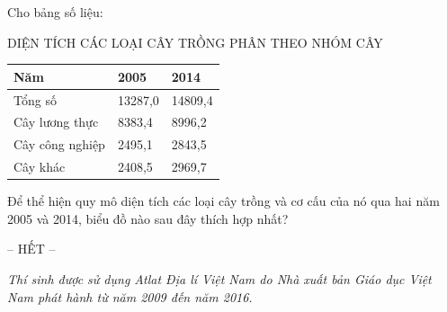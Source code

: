 \documentclass[11pt]{article}
\begin{document}
\begin{vnmultiplechoice}[ rearrange=yes, keycolumns=3]
\begin{question} %
 Cho bảng số liệu:\\
\centerline{DIỆN TÍCH CÁC LOẠI CÂY TRỒNG PHÂN THEO NHÓM CÂY}
\begin{center}
\begin{tabular}{| l | l | l |}\hline
\textbf{Năm}&\textbf{2005}&\textbf{2014}\\ \hline
Tổng số&13287,0&14809,4\\ \hline
Cây lương thực&8383,4&8996,2\\ \hline
Cây công nghiệp&2495,1&2843,5\\ \hline
Cây khác&2408,5&2969,7\\ \hline
\end{tabular}
\end{center}
Để thể hiện quy mô diện tích các loại cây trồng và cơ cấu của nó qua hai năm 2005 và 2014, biểu đồ
nào sau đây thích hợp nhất?
\datcot
\bonpa
{}
{}
{}
{}
\end{question}

\begin{examclosing}
\centerline{-- HẾT --}
\textit{Thí sinh được sử dụng Atlat Địa lí Việt Nam do Nhà xuất bản Giáo dục Việt Nam phát hành từ năm
2009 đến năm 2016.}
\end{examclosing}
 \end{vnmultiplechoice}
\end{document}
